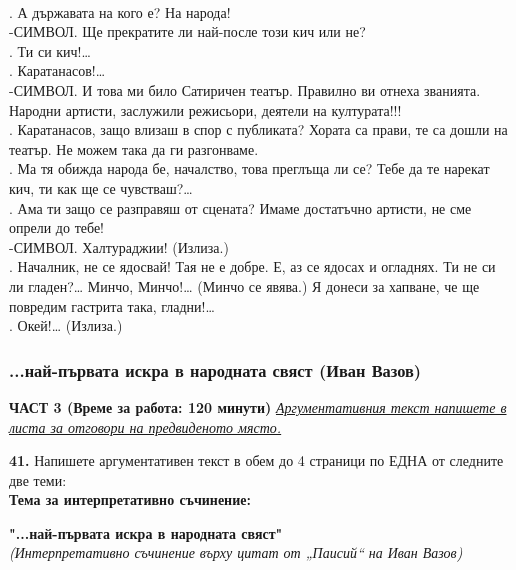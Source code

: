 \documentclass[12pt,a4paper]{article}
\begin{document}
\\
. А държавата на кого е? На народа!
\\
-СИМВОЛ. Ще прекратите ли най-после този кич или не?
\\
. Ти си кич!…
\\
. Каратанасов!…
\\
-СИМВОЛ. И това ми било Сатиричен театър. Правилно ви отнеха званията. Народни артисти, заслужили режисьори, деятели на културата!!!
\\
. Каратанасов, защо влизаш в спор с публиката? Хората са прави, те са дошли на театър. Не можем така да ги разгонваме.
\\
. Ма тя обижда народа бе, началство, това преглъща ли се? Тебе да те нарекат кич, ти как ще се чувстваш?…
\\
. Ама ти защо се разправяш от сцената? Имаме достатъчно артисти, не сме опрели до тебе!
\\
-СИМВОЛ. Халтураджии! (Излиза.)
\\
. Началник, не се ядосвай! Тая не е добре. Е, аз се ядосах и огладнях. Ти не си ли гладен?… Минчо, Минчо!… (Минчо се явява.) Я донеси за хапване, че ще повредим гастрита така, гладни!…
\\
. Окей!… (Излиза.)

\subsubsection{...най-първата искра в народната свяст (Иван Вазов)}
\vspace{0.5cm}
\begin{center}
\textbf{ЧАСТ 3 (Време за работа: 120 минути)}
\vspace{0.2cm}
{\textit{\underline{Аргументативния текст напишете в листа за отговори на предвиденото място.}}}
\vspace{0.1cm}
\end{center}
\textbf{41.} Напишете аргументативен текст в обем до 4 страници по ЕДНА от следните две теми:
\\
\vspace{0.2cm}
\textbf{Тема за интерпретативно съчинение:}
\vspace{0.1cm}
\begin{center}
\textbf{"...най-първата искра в народната свяст"}
\\
\textit{(Интерпретативно съчинение върху цитат от „Паисий“ на Иван Вазов)}
\end{center}
\end{document}
